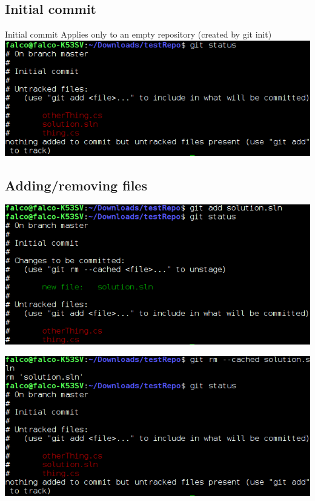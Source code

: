 \documentclass[10pt,a4paper]{beamer}
\begin{document}
\subsection{Initial commit}
\begin{frame}{Initial commit}
Applies only to an empty repository (created by git init)
\includegraphics[width=\linewidth]{gitStatus1.png}
\end{frame}

\subsection{Adding/removing files}
\begin{frame}
\includegraphics[width=\linewidth]{gitAdd.png}
\end{frame}

\begin{frame}
\includegraphics[width=\linewidth]{gitrmcached.png}
\end{frame}
\end{document}
